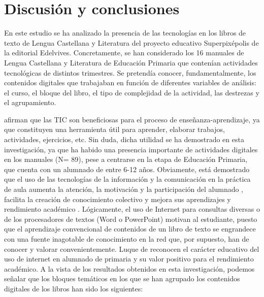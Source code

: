 \documentclass[spanish]{textolivre}
\begin{document}
\section{Discusión y conclusiones}\label{sec-conclusao}
En este estudio se ha analizado la presencia de las tecnologías en los libros de texto de Lengua Castellana y Literatura del proyecto educativo Superpixépolis de la editorial Edelvives. Concretamente, se han considerado los 16 manuales de Lengua Castellana y Literatura de Educación Primaria que contenían actividades tecnológicas de distintos trimestres. Se pretendía conocer, fundamentalmente, los contenidos digitales que trabajaban en función de diferentes variables de análisis: el curso, el bloque del libro, el tipo de complejidad de la actividad, las destrezas y el agrupamiento. 

\textcite{marin_diaz_universidad_2012} afirman que las TIC son beneficiosas para el proceso de enseñanza-aprendizaje, ya que constituyen una herramienta útil para aprender, elaborar trabajos, actividades, ejercicios, etc. Sin duda, dicha utilidad se ha demostrado en esta investigación, ya que ha habido una presencia importante de actividades digitales en los manuales (N= 89), pese a centrarse en la etapa de Educación Primaria, que cuenta con un alumnado de entre 6-12 años. Obviamente, está demostrado que el uso de las tecnologías de la información y la comunicación en la práctica de aula aumenta la atención, la motivación y la participación del alumnado \cite{domingo-coscollola_classroom_2011}, facilita la creación de conocimiento colectivo \cite{gairin_sallan_2010} y mejora sus aprendizajes y rendimiento académico \cite{prats_i_fernandez_pueden_2015}. Lógicamente, el uso de Internet para consultas diversas o de los procesadores de textos (Word o PowerPoint) motivan al estudiante, puesto que el aprendizaje convencional de contenidos de un libro de texto se engrandece con una fuente inagotable de conocimiento en la red que, por supuesto, han de conocer y valorar convenientemente. Luque de \textcite{luque_de_la_rosa_tecnologias_2015} reconocen el carácter educativo del uso de internet en alumnado de primaria y su valor positivo para el rendimiento académico. 
A la vista de los resultados obtenidos en esta investigación, podemos señalar que los bloques temáticos en los que se han agrupado los contenidos digitales de los libros han sido los siguientes: 
\end{document}
